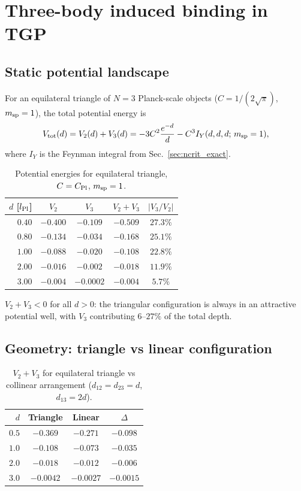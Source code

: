 \section{Three-body induced binding in TGP}
\label{sec:bound_state}

\subsection{Static potential landscape}

For an equilateral triangle of $N=3$ Planck-scale objects ($C=1/(2\sqrt{\pi})$,
$m_{\rm sp}=1$), the total potential energy is
\begin{equation}
  V_{\rm tot}(d) = V_2(d) + V_3(d)
  = -3C^2\frac{e^{-d}}{d} - C^3 I_Y(d,d,d;\,m_{\rm sp}=1),
\end{equation}
where $I_Y$ is the Feynman integral from Sec.~\ref{sec:ncrit_exact}.

\begin{table}[h]
\centering
\caption{Potential energies for equilateral triangle, $C=C_{\rm Pl}$, $m_{\rm sp}=1$.}
\label{tab:Epot_scan}
\begin{tabular}{rcccc}
\hline
$d$ [$l_{\rm Pl}$] & $V_2$ & $V_3$ & $V_2+V_3$ & $|V_3/V_2|$ \\
\hline
$0.40$ & $-0.400$ & $-0.109$ & $-0.509$ & $27.3\%$ \\
$0.80$ & $-0.134$ & $-0.034$ & $-0.168$ & $25.1\%$ \\
$1.00$ & $-0.088$ & $-0.020$ & $-0.108$ & $22.8\%$ \\
$2.00$ & $-0.016$ & $-0.002$ & $-0.018$ & $11.9\%$ \\
$3.00$ & $-0.004$ & $-0.0002$ & $-0.004$ & $ 5.7\%$ \\
\hline
\end{tabular}
\end{table}

\noindent
$V_2+V_3 < 0$ for all $d>0$: the triangular configuration is always in
an attractive potential well, with $V_3$ contributing $6$--$27\%$ of the
total depth.

\subsection{Geometry: triangle vs linear configuration}

\begin{table}[h]
\centering
\caption{$V_2+V_3$ for equilateral triangle vs collinear arrangement
($d_{12}=d_{23}=d$, $d_{13}=2d$).}
\label{tab:geom_comparison}
\begin{tabular}{rccc}
\hline
$d$ & Triangle & Linear & $\Delta$ \\
\hline
$0.5$ & $-0.369$ & $-0.271$ & $-0.098$ \\
$1.0$ & $-0.108$ & $-0.073$ & $-0.035$ \\
$2.0$ & $-0.018$ & $-0.012$ & $-0.006$ \\
$3.0$ & $-0.0042$ & $-0.0027$ & $-0.0015$ \\
\hline
\end{tabular}
\end{table}

